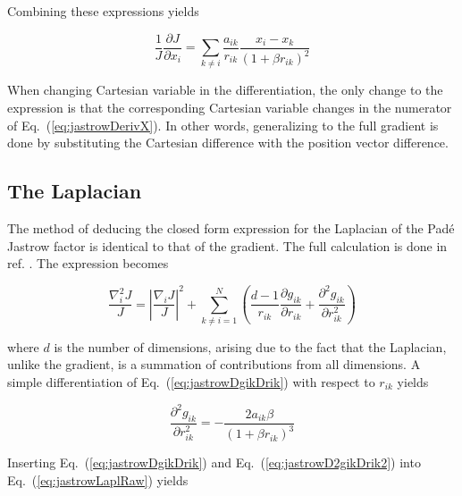 Combining these expressions yields

\begin{equation}
\label{eq:jastrowDerivX}
 \frac{1}{J}\frac{\partial J}{\partial x_i} = \sum_{k \ne i} \frac{a_{ik}}{r_{ik}}\frac{x_i - x_k}{(1 + \beta r_{ik})^2}
\end{equation}

When changing Cartesian variable in the differentiation, the only change to the expression is that the corresponding Cartesian variable changes in the numerator of Eq.~(\ref{eq:jastrowDerivX}). In other words, generalizing to the full gradient is done by substituting the Cartesian difference with the position vector difference.



\subsection{The Laplacian}

The method of deducing the closed form expression for the Laplacian of the Padé Jastrow factor is identical to that of the gradient. The full calculation is done in ref. \cite{morten}. The expression becomes

\begin{equation}
\label{eq:jastrowLaplRaw}
 \frac{\nabla^2_i J}{J} = \left| \frac{\nabla_i J}{J}\right|^2 + \sum_{k \ne i = 1}^N \left(\frac{d-1}{r_{ik}}\frac{\partial g_{ik}}{\partial r_{ik}} + \frac{\partial^2 g_{ik}}{\partial r_{ik}^2}\right) 
\end{equation}

where $d$ is the number of dimensions, arising due to the fact that the Laplacian, unlike the gradient, is a summation of contributions from all dimensions. A simple differentiation of Eq.~(\ref{eq:jastrowDgikDrik}) with respect to $r_{ik}$ yields

\begin{equation}
\label{eq:jastrowD2gikDrik2}
 \frac{\partial^2 g_{ik}}{\partial r_{ik}^2} = -\frac{2a_{ik}\beta}{(1 + \beta r_{ik})^3}
\end{equation}

Inserting Eq.~(\ref{eq:jastrowDgikDrik}) and Eq.~(\ref{eq:jastrowD2gikDrik2}) into Eq.~(\ref{eq:jastrowLaplRaw}) yields

